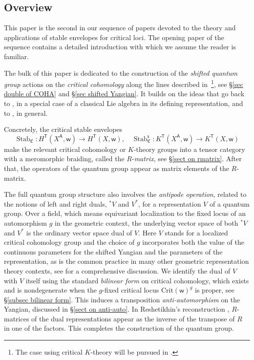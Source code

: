 \documentclass[10pt]{amsart}
\theoremstyle{definition}
\numberwithin{equation}{section}
\newcommand{\Crit}{\mathrm{Crit}}
\newcommand{\fC}{\mathfrak{C}}
\newcommand{\sA}{\mathsf{A}}
\newcommand{\sT}{\mathsf{T}}
\newcommand{\sw}{\mathsf{w}}
\newcommand{\Stab}{\operatorname{Stab}}
\begin{document}
\subsection{Overview}



This paper is the second in our sequence of papers devoted to
the theory and applications of stable envelopes for critical
loci. The opening paper \cite{COZZ} of the sequence contains
a detailed introduction with which we assume the reader is
familiar.

The bulk of this paper is dedicated to the construction
of the \textit{shifted quantum group} actions on the \textit{critical
cohomology} along the lines described
in \cite[\S 1.8, \S 1.9]{COZZ}\,\footnote{The case using critical $K$-theory will be pursued in \cite{COZZ2}.}, see \S \ref{sec double of COHA} and \S \ref{sec shifted Yangian}. 
It builds on the ideas that go back to \cite{FRT}, in a
special case of a classical Lie algebra in its defining representation, and to \cite{Resh90}, in general. 

Concretely, the critical stable envelopes 
$$\Stab_\fC\colon H^{\sT}(X^\sA,\sw) \to H^{\sT}(X,\sw), \quad   \Stab^{\mathsf s}_{\fC}\colon K^{\sT}(X^\sA,\sw) \to K^{\sT}(X,\sw) $$
make the relevant critical
cohomology or $K$-theory groups into a tensor
category with a meromorphic braiding, called the
$R$-\textit{matrix}, see \S \ref{sect on rmatrix}. After that, the operators of the quantum group
appear as matrix elements of the
$R$-matrix.

The full quantum group structure also involves the \textit{antipode operation},
related to the notions of left and right duals, ${}^*V$ and $V^*$, for
a representation $V$ of a quantum group. 
Over a field, which means equivariant
localization to the fixed locus of an automorphism $g$ in the geometric context,
the underlying vector space of both ${}^*V$ and $V^*$ is
the ordinary vector space dual of $V$. Here $V$ stands for a localized
critical cohomology group and the choice of $g$ incorporates both the
value of the continuous parameters for the shifted Yangian and
the parameters of the representation, as is the common practice in
many other geometric representation theory contexts, see \cite{CG} for
a comprehensive discussion. We identify the dual of $V$
with $V$ itself using the standard \textit{bilinear form} on critical cohomology,
which exists and is nondegenerate when the $g$-fixed critical locus $\Crit(\sw)^g$ is 
proper, see \S \ref{subsec bilinear form}. This induces a transposition
\textit{anti-automorphism} on the Yangian, discussed in \S \ref{sect on anti-auto}.
In Reshetikhin's reconstruction \cite{Resh90}, $R$-matrices of the
dual representations appear as the inverse of the transpose of $R$ in one
of the factors. This completes the construction of the quantum group. 
\end{document}
